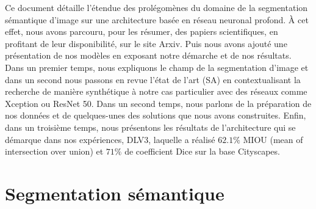 \documentclass[
10pt, %
a4paper, %
oneside, %
headinclude,footinclude, %
]{scrartcl}
\begin{document}
Ce document détaille l’étendue des prolégomènes du domaine de la segmentation sémantique d’image sur une architecture basée en réseau neuronal profond. À cet effet, nous avons parcouru, pour les résumer, des papiers scientifiques, en profitant de leur disponibilité, sur le site Arxiv. Puis nous avons ajouté une présentation de nos modèles en exposant notre démarche et de nos résultats. Dans un premier temps, nous expliquons le champ de la segmentation d’image et dans un second nous passons en revue l’état de l’art (\gls{SA}) en contextualisant la recherche de manière synthétique à notre cas particulier avec des réseaux comme Xception ou ResNet 50. Dans un second temps, nous parlons de la préparation de nos données et de quelques-unes des solutions que nous avons construites. Enfin, dans un troisième temps, nous présentons les résultats de l’architecture qui se démarque dans nos expériences, \gls{DLV3}, laquelle a réalisé $62.1\%$ \gls{MIOU} (mean of intersection over union) et $71\%$ de coefficient Dice sur la base Cityscapes.







\section{Segmentation sémantique}
\end{document}
